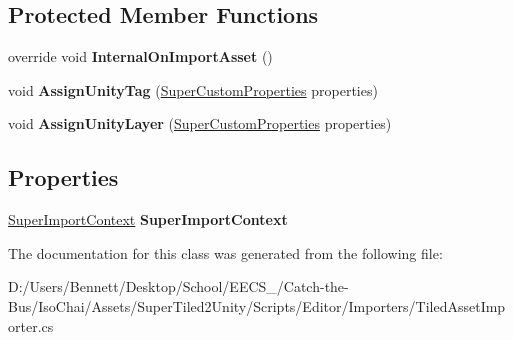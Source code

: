 \subsection*{Protected Member Functions}
\begin{DoxyCompactItemize}
\item 
\mbox{\label{class_super_tiled2_unity_1_1_editor_1_1_tiled_asset_importer_a7503cca09089fbe897b760630cb671b3}} 
override void {\bfseries Internal\+On\+Import\+Asset} ()
\item 
\mbox{\label{class_super_tiled2_unity_1_1_editor_1_1_tiled_asset_importer_a2adeaf11ced560d4e674b5028363d3f4}} 
void {\bfseries Assign\+Unity\+Tag} (\mbox{\hyperlink{class_super_tiled2_unity_1_1_super_custom_properties}{Super\+Custom\+Properties}} properties)
\item 
\mbox{\label{class_super_tiled2_unity_1_1_editor_1_1_tiled_asset_importer_ad6931c1bdc81fb1330c7c5620e5f65ca}} 
void {\bfseries Assign\+Unity\+Layer} (\mbox{\hyperlink{class_super_tiled2_unity_1_1_super_custom_properties}{Super\+Custom\+Properties}} properties)
\end{DoxyCompactItemize}
\subsection*{Properties}
\begin{DoxyCompactItemize}
\item 
\mbox{\label{class_super_tiled2_unity_1_1_editor_1_1_tiled_asset_importer_aa2d00bc9c96e1ca7fc38d4efb6b7addb}} 
\mbox{\hyperlink{class_super_tiled2_unity_1_1_editor_1_1_super_import_context}{Super\+Import\+Context}} {\bfseries Super\+Import\+Context}
\end{DoxyCompactItemize}


The documentation for this class was generated from the following file\+:\begin{DoxyCompactItemize}
\item 
D\+:/\+Users/\+Bennett/\+Desktop/\+School/\+E\+E\+C\+S\+\_/\+Catch-\/the-\/\+Bus/\+Iso\+Chai/\+Assets/\+Super\+Tiled2\+Unity/\+Scripts/\+Editor/\+Importers/Tiled\+Asset\+Importer.\+cs\end{DoxyCompactItemize}
